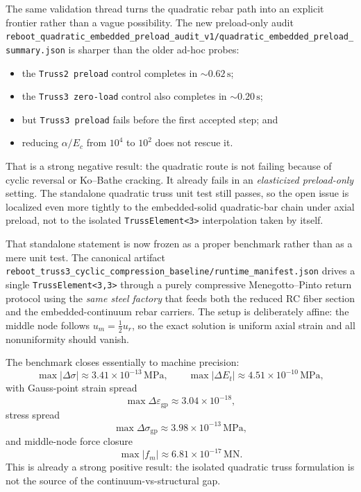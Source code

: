The same validation thread turns the quadratic rebar path into an explicit
frontier rather than a vague possibility.  The new preload-only audit
\texttt{reboot\_quadratic\_embedded\_preload\_audit\_v1/quadratic\_embedded\_preload\_summary.json}
is sharper than the older ad-hoc probes:
\begin{itemize}
  \item the \texttt{Truss2 preload} control completes in
        \(\sim 0.62\,\mathrm{s}\);
  \item the \texttt{Truss3 zero-load} control also completes in
        \(\sim 0.20\,\mathrm{s}\);
  \item but \texttt{Truss3 preload} fails before the first accepted step; and
  \item reducing \(\alpha/E_c\) from \(10^4\) to \(10^2\) does not rescue it.
\end{itemize}
That is a strong negative result: the quadratic route is not failing because of
cyclic reversal or Ko--Bathe cracking.  It already fails in an
\emph{elasticized preload-only} setting.  The standalone quadratic truss unit
test still passes, so the open issue is localized even more tightly to the
embedded-solid quadratic-bar chain under axial preload, not to the isolated
\texttt{TrussElement<3>} interpolation taken by itself.

That standalone statement is now frozen as a proper benchmark rather than as a
mere unit test. The canonical artifact
\texttt{reboot\_truss3\_cyclic\_compression\_baseline/runtime\_manifest.json}
drives a single \texttt{TrussElement<3,3>} through a purely compressive
Menegotto--Pinto return protocol using the \emph{same steel factory} that feeds
both the reduced RC fiber section and the embedded-continuum rebar carriers.
The setup is deliberately affine: the middle node follows
\(u_m = \tfrac{1}{2}u_r\), so the exact solution is uniform axial strain and
all nonuniformity should vanish.

The benchmark closes essentially to machine precision:
\[
\max |\Delta \sigma| \approx 3.41\times10^{-13}\,\mathrm{MPa},\qquad
\max |\Delta E_t| \approx 4.51\times10^{-10}\,\mathrm{MPa},
\]
with Gauss-point strain spread
\[
\max \Delta \varepsilon_{\mathrm{gp}} \approx 3.04\times10^{-18},
\]
stress spread
\[
\max \Delta \sigma_{\mathrm{gp}} \approx 3.98\times10^{-13}\,\mathrm{MPa},
\]
and middle-node force closure
\[
\max |f_m| \approx 6.81\times10^{-17}\,\mathrm{MN}.
\]
This is already a strong positive result: the isolated quadratic truss
formulation is not the source of the continuum-vs-structural gap.

